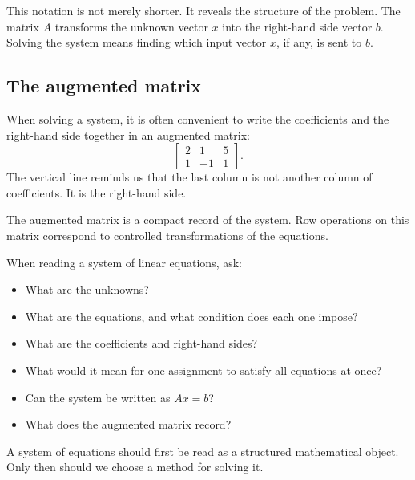 This notation is not merely shorter. It reveals the structure of the problem. The matrix \(A\) transforms the unknown vector \(x\) into the right-hand side vector \(b\). Solving the system means finding which input vector \(x\), if any, is sent to \(b\).

\subsection*{The augmented matrix}

When solving a system, it is often convenient to write the coefficients and the right-hand side together in an augmented matrix:
\[
\left[
\begin{array}{cc|c}
2&1&5\\
1&-1&1
\end{array}
\right].
\]
The vertical line reminds us that the last column is not another column of coefficients. It is the right-hand side.

The augmented matrix is a compact record of the system. Row operations on this matrix correspond to controlled transformations of the equations.

\begin{summarybox}
When reading a system of linear equations, ask:
\begin{itemize}
\item What are the unknowns?
\item What are the equations, and what condition does each one impose?
\item What are the coefficients and right-hand sides?
\item What would it mean for one assignment to satisfy all equations at once?
\item Can the system be written as \(Ax=b\)?
\item What does the augmented matrix record?
\end{itemize}
\end{summarybox}

A system of equations should first be read as a structured mathematical object. Only then should we choose a method for solving it.